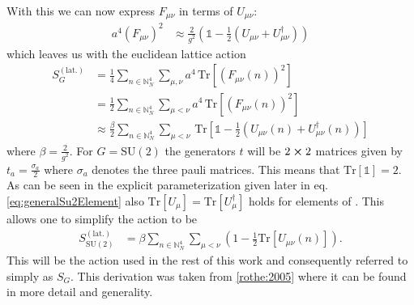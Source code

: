 With this we can now express $F_{\mu \nu}$ in terms of $U_{\mu \nu}$:
\begin{align*}
 a^4 (F_{\mu \nu})^2 & \approx \frac{2}{g^2} \left( \mathbb{1} - \frac{1}{2}\left( U_{\mu \nu} + U_{\mu \nu}^\dagger \right) \right)
\end{align*}
which leaves us with the euclidean lattice action
\begin{align*}
 S^{(\textrm{lat.})}_G & = \frac{1}{4} \sum_{n \in \mathbb{N}^4_N} \sum_{\mu,\nu} a^4 \, \mathrm{Tr} \left[ \left( F_{\mu \nu} (n) \right)^2  \right]                                                        \\
                       & = \frac{1}{2} \sum_{n \in \mathbb{N}^4_N} \sum_{\mu < \nu}  a^4 \, \mathrm{Tr} \left[ \left( F_{\mu \nu} (n) \right)^2  \right]                                                     \\
                       & \approx \frac{\beta}{2} \sum_{n \in \mathbb{N}^4_N} \sum_{\mu < \nu} \, \mathrm{Tr} \left[ \mathbb{1} - \frac{1}{2}\left( U_{\mu \nu} (n) + U_{\mu \nu}^\dagger (n) \right) \right]
\end{align*}
where $\beta = \frac{2}{g^2}$. For $G=\mathrm{SU}(2)$ the generators $t$ will be $2 \cross 2$ matrices given by $t_a = \frac{\sigma_a}{2}$ where $\sigma_a$ denotes the three pauli matrices. This means that $\mathrm{Tr}\left[ \mathbb{1} \right] = 2$. As can be seen in the explicit parameterization given later in eq.  \ref{eq:generalSu2Element} also $ \mathrm{Tr} \left[ U_\mu \right] = \mathrm{Tr} \left[ U_\mu^\dagger \right] $ holds for elements of \SUTwo. This allows one to simplify the action to be
\begin{align*}
 S^{(\textrm{lat.})}_{\mathrm{SU}(2)} & = \beta \sum_{n \in \mathbb{N}^4_N} \sum_{\mu < \nu} \left( 1 - \frac{1}{2} \mathrm{Tr} \left[ U_{\mu \nu} (n) \right] \right) \textrm{.}
\end{align*}
This will be the action used in the rest of this work and consequently referred to simply as $S_G$.
This derivation was taken from \ref{rothe:2005} where it can be found in more detail and generality.
